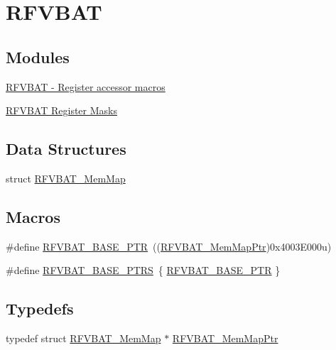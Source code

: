 \hypertarget{group___r_f_v_b_a_t___peripheral}{}\section{R\+F\+V\+B\+A\+T}
\label{group___r_f_v_b_a_t___peripheral}
\subsection*{Modules}
\begin{DoxyCompactItemize}
\item 
\hyperlink{group___r_f_v_b_a_t___register___accessor___macros}{R\+F\+V\+B\+A\+T -\/ Register accessor macros}
\item 
\hyperlink{group___r_f_v_b_a_t___register___masks}{R\+F\+V\+B\+A\+T Register Masks}
\end{DoxyCompactItemize}
\subsection*{Data Structures}
\begin{DoxyCompactItemize}
\item 
struct \hyperlink{struct_r_f_v_b_a_t___mem_map}{R\+F\+V\+B\+A\+T\+\_\+\+Mem\+Map}
\end{DoxyCompactItemize}
\subsection*{Macros}
\begin{DoxyCompactItemize}
\item 
\#define \hyperlink{group___r_f_v_b_a_t___peripheral_ga5b6418d9be20f84b2190ccf6134b7ba3}{R\+F\+V\+B\+A\+T\+\_\+\+B\+A\+S\+E\+\_\+\+P\+T\+R}~((\hyperlink{group___r_f_v_b_a_t___peripheral_gaf818ad4cab94790b0374758504777f4f}{R\+F\+V\+B\+A\+T\+\_\+\+Mem\+Map\+Ptr})0x4003\+E000u)
\item 
\#define \hyperlink{group___r_f_v_b_a_t___peripheral_gab0495e22a00c365211c3c8510feca9f2}{R\+F\+V\+B\+A\+T\+\_\+\+B\+A\+S\+E\+\_\+\+P\+T\+R\+S}~\{ \hyperlink{group___r_f_v_b_a_t___peripheral_ga5b6418d9be20f84b2190ccf6134b7ba3}{R\+F\+V\+B\+A\+T\+\_\+\+B\+A\+S\+E\+\_\+\+P\+T\+R} \}
\end{DoxyCompactItemize}
\subsection*{Typedefs}
\begin{DoxyCompactItemize}
\item 
typedef struct \hyperlink{struct_r_f_v_b_a_t___mem_map}{R\+F\+V\+B\+A\+T\+\_\+\+Mem\+Map} $\ast$ \hyperlink{group___r_f_v_b_a_t___peripheral_gaf818ad4cab94790b0374758504777f4f}{R\+F\+V\+B\+A\+T\+\_\+\+Mem\+Map\+Ptr}
\end{DoxyCompactItemize}


